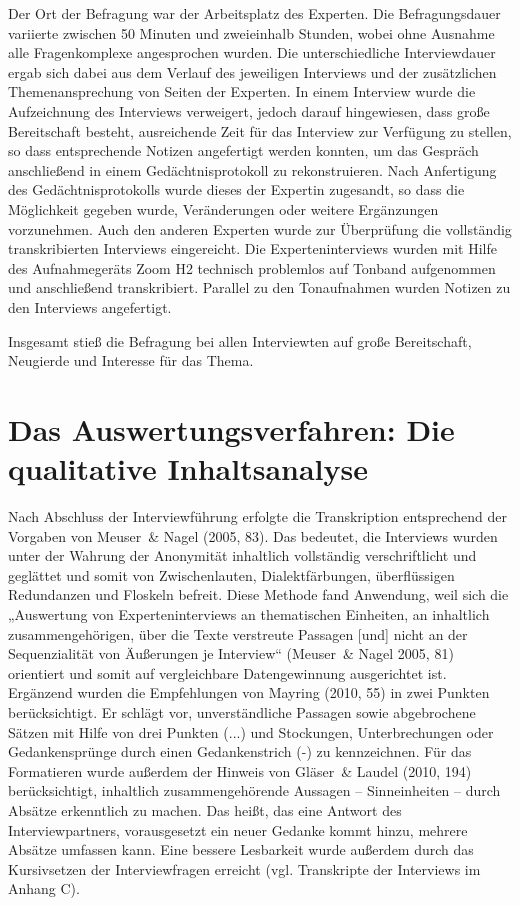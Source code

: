 Der Ort der Befragung war der Arbeitsplatz des Experten. Die Befragungsdauer variierte zwischen 50 Minuten und zweieinhalb Stunden, wobei ohne Ausnahme alle Fragenkomplexe angesprochen wurden. Die unterschiedliche Interviewdauer ergab sich dabei aus dem Verlauf des jeweiligen Interviews und der zusätzlichen Themenansprechung von Seiten der Experten. In einem Interview wurde die Aufzeichnung des Interviews verweigert, jedoch darauf hingewiesen, dass große Bereitschaft besteht, ausreichende Zeit für das Interview zur Verfügung zu stellen, so dass entsprechende Notizen angefertigt werden konnten, um das Gespräch anschließend in einem Gedächtnisprotokoll zu rekonstruieren. Nach Anfertigung des Gedächtnisprotokolls wurde dieses der Expertin zugesandt, so dass die Möglichkeit gegeben wurde, Veränderungen oder weitere Ergänzungen vorzunehmen. Auch den anderen Experten wurde zur Überprüfung die vollständig transkribierten Interviews eingereicht. 
Die Experteninterviews wurden mit Hilfe des Aufnahmegeräts Zoom H2 technisch problemlos auf Tonband aufgenommen und anschließend transkribiert. Parallel zu den Tonaufnahmen wurden Notizen zu den Interviews angefertigt. 

Insgesamt stieß die Befragung bei allen Interviewten auf große Bereitschaft, Neugierde und Interesse für das Thema.

\section{Das Auswertungsverfahren: Die qualitative Inhaltsanalyse}

Nach Abschluss der Interviewführung erfolgte die Transkription entsprechend der Vorgaben von Meuser~\& Nagel (2005, 83). Das bedeutet, die Interviews wurden unter der Wahrung der Anonymität inhaltlich vollständig verschriftlicht und geglättet und somit von Zwischenlauten, Dialektfärbungen, überflüssigen Redundanzen und Floskeln befreit. Diese Methode fand Anwendung, weil sich die „Auswertung von Experteninterviews an thematischen Einheiten, an inhaltlich zusammengehörigen, über die Texte verstreute Passagen [und] nicht an der Sequenzialität von Äußerungen je Interview“ (Meuser~\& Nagel 2005, 81) orientiert und somit auf vergleichbare Datengewinnung ausgerichtet ist. 
Ergänzend wurden die Empfehlungen von Mayring (2010, 55) in zwei Punkten berücksichtigt. Er schlägt vor, unverständliche Passagen sowie abgebrochene Sätzen mit Hilfe von drei Punkten (...) und Stockungen, Unterbrechungen oder Gedankensprünge durch einen Gedankenstrich (-) zu kennzeichnen. 
Für das Formatieren wurde außerdem der Hinweis von Gläser~\& Laudel (2010, 194) berücksichtigt, inhaltlich zusammengehörende Aussagen -- Sinneinheiten -- durch Absätze erkenntlich zu machen. Das heißt, das eine Antwort des Interviewpartners, vorausgesetzt ein neuer Gedanke kommt hinzu, mehrere Absätze umfassen kann. Eine bessere Lesbarkeit wurde außerdem durch das Kursivsetzen der Interviewfragen erreicht (vgl. Transkripte der Interviews im Anhang C). 

